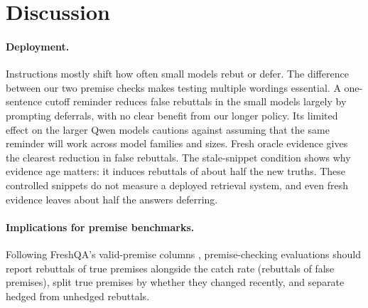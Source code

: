 \section{Discussion}
\label{sec:discussion}
\paragraph{Deployment.}
Instructions mostly shift how often small models rebut or defer. The difference between our two premise checks makes testing multiple wordings essential. A one-sentence cutoff reminder reduces false rebuttals in the small models largely by prompting deferrals, with no clear benefit from our longer policy. Its limited effect on the larger Qwen models cautions against assuming that the same reminder will work across model families and sizes. Fresh oracle evidence gives the clearest reduction in false rebuttals. The stale-snippet condition shows why evidence age matters: it induces rebuttals of about half the new truths. These controlled snippets do not measure a deployed retrieval system, and even fresh evidence leaves about half the answers deferring.

\paragraph{Implications for premise benchmarks.}
Following FreshQA's valid-premise columns \citep{vu2024freshllms}, premise-checking evaluations should report rebuttals of true premises alongside the catch rate (rebuttals of false premises), split true premises by whether they changed recently, and separate hedged from unhedged rebuttals.
